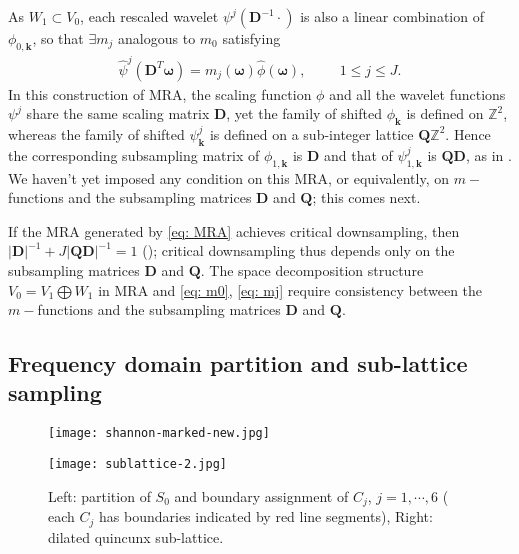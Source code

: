 As $W_1\subset V_0$, each rescaled wavelet $\psi^j(\mathbf{D}^{-1}\cdot)$ is also a linear combination of $\phi_{0,\boldsymbol{k}}$, so that $\exists m_j$ analogous to $m_0$
satisfying 
\begin{align}\label{eq: mj}
\widehat{\psi}^j(\mathbf{D}^T\boldsymbol{\omega}) = m_j(\boldsymbol{\omega})\widehat{\phi}(\boldsymbol{\omega}),\hspace{1cm} 1\leq j \leq J.
\end{align}
In this construction of MRA, the scaling function $\phi$ and all the wavelet functions $\psi^j$ share the same scaling matrix $\mathbf{D}$, yet the family of shifted $\phi_{\boldsymbol{k}}$ is defined on $\mathbb{Z}^2$, whereas the family of shifted $\psi^j_{\boldsymbol{k}}$ is defined on a sub-integer lattice $\mathbf{Q}\mathbb{Z}^2$. Hence the corresponding subsampling matrix  of $\phi_{1,\boldsymbol{k}}$ is $\mathbf{D}$ and that of $\psi^j_{1,\boldsymbol{k}}$ is $\mathbf{QD}$, as in \cite{durand2007}. We haven't yet imposed any condition on this MRA, or equivalently, on $m-$functions and the subsampling matrices $\mathbf{D}$ and $\mathbf{Q}$; this comes next.

If the MRA generated by \eqref{eq: MRA} achieves critical downsampling, then $ |\mathbf{D}|^{-1} + J|\mathbf{QD}|^{-1} = 1$ (\cite{durand2007}); 
critical downsampling thus depends only on the subsampling matrices $\mathbf{D}$ and $\mathbf{Q}$. The space decomposition structure $V_0 = V_1\bigoplus W_1$ in MRA and \eqref{eq: m0}, \eqref{eq: mj} require consistency between the $m-$functions and the subsampling matrices $\mathbf{D}$ and $\mathbf{Q}$. 

\subsection{Frequency domain partition and sub-lattice sampling}

\begin{figure}[!t]
\centering
\begin{minipage}[c]{.35\textwidth}
\texttt{[image: shannon-marked-new.jpg]}
\end{minipage}\hspace*{2em}
\begin{minipage}[c]{.35\textwidth}
\texttt{[image: sublattice-2.jpg]}
\end{minipage}
\caption{Left: partition of $S_0$ and boundary assignment of $C_j$, $j = 1,\cdots,6$ ( each $C_j$ has boundaries indicated by red line segments), Right: dilated quincunx sub-lattice. }
\label{fig: partition}
\vspace*{-5mm}
\end{figure}

